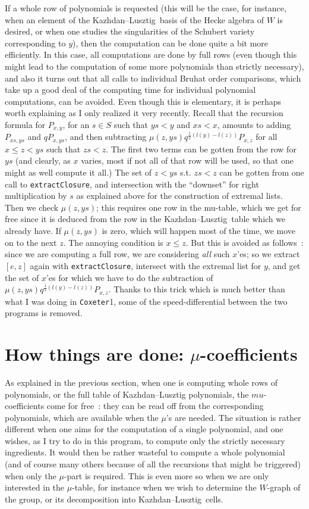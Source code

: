 \documentclass[11pt]{article}
\newcommand{\coxeter}{{\tt Coxeter}}
\newcommand{\kl}{Kazh\-dan--Lusz\-tig}
\newcommand{\klpol}{Kazh\-dan--Lusz\-tig po\-ly\-no\-mial}
\begin{document}
If a whole row of polynomials is requested (this will be the case, for
instance, when an element of the \kl\ basis of the Hecke algebra of $W$ is
desired, or when one studies the singularities of the Schubert variety
corresponding to $y$), then the computation can be done quite a bit more
efficiently. In this case, all computations are done by full rows (even though
this might lead to the computation of some more polynomials than strictly
necessary), and also it turns out that all calls to individual Bruhat order
comparisons, which take up a good deal of the computing time for individual
polynomial computations, can be avoided. Even though this is elementary, it is
perhaps worth explaining as I only realized it very recently. Recall that the
recursion formula for $P_{x,y}$, for an $s\in S$ such that $ys<y$ and $xs<x$,
amounts to adding $P_{xs,ys}$ and $qP_{x,ys}$, and then subtracting
$\mu(z,ys)q^{\frac{1}{2}(l(y)-l(z))}P_{x,z}$ for all $x\leq z<ys$ such that
$zs<z$. The first two terms can be gotten from the row for $ys$ (and clearly,
as $x$ varies, most if not all of that row will be used, so that one might as
well compute it all.) The set of $z<ys$ s.t. $zs<z$ can be gotten from one call
to {\tt extractClosure}, and intersection with the ``downset'' for right
multiplication by $s$ as explained above for the construction of extremal
lists. Then we check $\mu(z,ys)$; this requires one row in the mu-table, which
we get for free since it is deduced from the row in the \kl\ table which we
already have. If $\mu(z,ys)$ is zero, which will happen most of the time, we
move on to the next $z$. The annoying condition is $x\leq z$. But this is
avoided as follows~: since we are computing a full row, we are considering {\em
all} such $x$'es; so we extract $[e,z]$ again with {\tt extractClosure},
intersect with the extremal list for $y$, and get the set of $x$'es for which
we have to do the subtraction of $\mu(z,ys)q^{\frac{1}{2}(l(y)-l(z))}P_{x,z}$.
Thanks to this trick which is much better than what I was doing in \coxeter1,
some of the speed-differential between the two programs is removed.

\section{How things are done: $\mu$-coefficients}\label{section:mucoeffs}

As explained in the previous section, when one is computing whole rows of
polynomials, or the full table of \klpol s, the $mu$-coefficients come for
free~: they can be read off from the corresponding polynomials, which are
available when the $\mu$'s are needed. The situation is rather different
when one aims for the computation of a single polynomial, and one wishes,
as I try to do in this program, to compute only the strictly necessary
ingredients. It would then be rather wasteful to compute a whole polynomial
(and of course many others because of all the recursions that might be
triggered) when only the $\mu$-part is required. This is even more so when
we are only interested in the $\mu$-table, for instance when we wish to
determine the $W$-graph of the group, or its decomposition into \kl\ cells.
\end{document}
